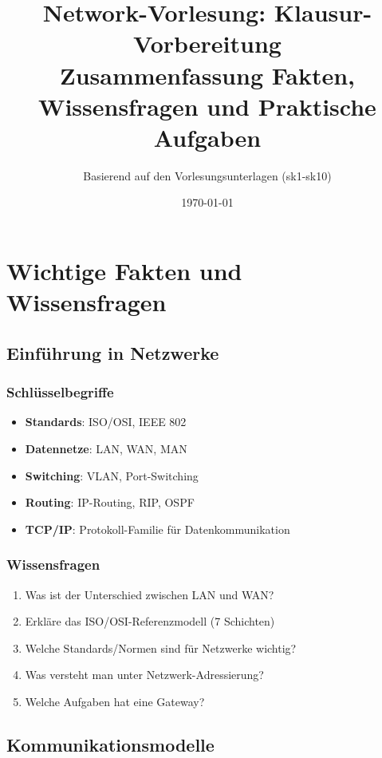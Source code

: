 \documentclass[12pt,a4paper,german]{report}
\title{\textbf{Network-Vorlesung: Klausur-Vorbereitung}\\
Zusammenfassung Fakten, Wissensfragen und Praktische Aufgaben}
\author{Basierend auf den Vorlesungsunterlagen (sk1-sk10)}
\date{\today}
\begin{document}
\maketitle

\tableofcontents
\newpage

\part{Wichtige Fakten und Wissensfragen}

\chapter{Einführung in Netzwerke}

\section{Schlüsselbegriffe}
\begin{itemize}
    \item \textbf{Standards}: ISO/OSI, IEEE 802
    \item \textbf{Datennetze}: LAN, WAN, MAN
    \item \textbf{Switching}: VLAN, Port-Switching
    \item \textbf{Routing}: IP-Routing, RIP, OSPF
    \item \textbf{TCP/IP}: Protokoll-Familie für Datenkommunikation
\end{itemize}

\section{Wissensfragen}
\begin{enumerate}
    \item Was ist der Unterschied zwischen LAN und WAN?
    \item Erkläre das ISO/OSI-Referenzmodell (7 Schichten)
    \item Welche Standards/Normen sind für Netzwerke wichtig?
    \item Was versteht man unter Netzwerk-Adressierung?
    \item Welche Aufgaben hat eine Gateway?
\end{enumerate}

\chapter{Kommunikationsmodelle}
\end{document}
